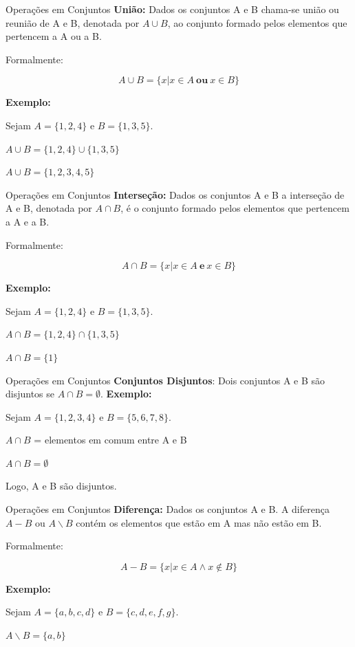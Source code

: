 \documentclass[aspectratio=169]{beamer}
\begin{document}
\begin{frame}{Operações em Conjuntos}
    \textbf{União:} Dados os conjuntos A e B chama-se união ou reunião de A e B, denotada por $A \cup B$, ao conjunto formado pelos elementos que pertencem a A ou a B.
    
    \vspace{4mm}
    Formalmente:

    \[A \cup B = \{x | x \in A ~ \boldsymbol{ou} ~ x \in B \}\]

    \textbf{Exemplo:}

    Sejam $A = \{1, 2, 4\}$ e $B = \{1, 3, 5\}$.

    $A \cup B = \{1, 2, 4\} \cup \{1, 3, 5\}$

    $A \cup B = \{1, 2, 3, 4, 5\}$

\end{frame}


\begin{frame}{Operações em Conjuntos}
    \textbf{Interseção:} Dados os conjuntos A e B a interseção de A e B, denotada por $A \cap B$, é o conjunto formado pelos elementos que pertencem a A e a B.
    
    \vspace{4mm}
    Formalmente:

    \[A \cap B = \{x | x \in A ~ \mathbf{e} ~ x \in B \}\]

    \textbf{Exemplo:}

    Sejam $A = \{1, 2, 4\}$ e $B = \{1, 3, 5\}$.

    $A \cap B = \{1, 2, 4\} \cap \{1, 3, 5\}$
    
    $A \cap B = \{1\}$

\end{frame}


\begin{frame}{Operações em Conjuntos}
  \textbf{  Conjuntos Disjuntos}: Dois conjuntos A e B são disjuntos se $A \cap B = \emptyset $.
    \vspace{4mm}
  \textbf{Exemplo:}

Sejam $A = \{1, 2, 3, 4\}$ e $B = \{5, 6, 7, 8\}$.

$A \cap B$ = elementos em comum entre A e B

$A\cap B=\emptyset$

Logo, A e B são disjuntos.
\end{frame}

\begin{frame}{Operações em Conjuntos}
    \textbf{Diferença: } Dados os conjuntos A e B. A diferença $A - B$ ou $A \backslash B$ contém os elementos que estão em A mas não estão em B.

    \vspace{4mm}
    Formalmente:

    \[ A - B = \{ x | x \in A \wedge x \notin B \} \]

    \textbf{Exemplo:}

    Sejam $A = \{a, b, c, d\}$ e $B = \{c, d, e, f, g\}$.

    $A \backslash B = \{a, b\}$

\end{frame}
\end{document}
